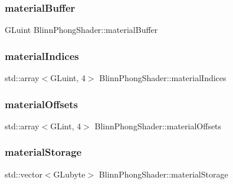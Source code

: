 \subsubsection{\texorpdfstring{material\+Buffer}{materialBuffer}}
{\footnotesize\ttfamily G\+Luint Blinn\+Phong\+Shader\+::material\+Buffer\hspace{0.3cm}{\ttfamily [protected]}}

\hypertarget{class_blinn_phong_shader_a2b14622a5d0f8ca32c05cc387700692a}{}\label{class_blinn_phong_shader_a2b14622a5d0f8ca32c05cc387700692a}
\subsubsection{\texorpdfstring{material\+Indices}{materialIndices}}
{\footnotesize\ttfamily std\+::array$<$G\+Luint, 4$>$ Blinn\+Phong\+Shader\+::material\+Indices\hspace{0.3cm}{\ttfamily [protected]}}

\hypertarget{class_blinn_phong_shader_a145f22608d6e32a4ec5df39388ad0530}{}\label{class_blinn_phong_shader_a145f22608d6e32a4ec5df39388ad0530}
\subsubsection{\texorpdfstring{material\+Offsets}{materialOffsets}}
{\footnotesize\ttfamily std\+::array$<$G\+Lint, 4$>$ Blinn\+Phong\+Shader\+::material\+Offsets\hspace{0.3cm}{\ttfamily [protected]}}

\hypertarget{class_blinn_phong_shader_a7c9644732d35c788d1c94f44b7783d83}{}\label{class_blinn_phong_shader_a7c9644732d35c788d1c94f44b7783d83}
\subsubsection{\texorpdfstring{material\+Storage}{materialStorage}}
{\footnotesize\ttfamily std\+::vector$<$G\+Lubyte$>$ Blinn\+Phong\+Shader\+::material\+Storage\hspace{0.3cm}{\ttfamily [protected]}}

